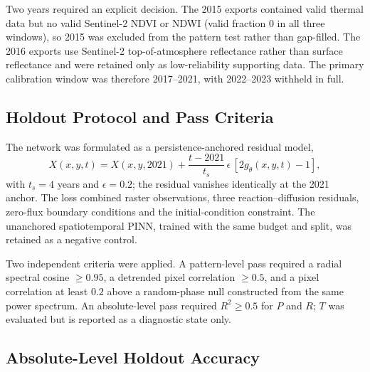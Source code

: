 \documentclass[12pt,a4paper]{article}
\begin{document}
Two years required an explicit decision. The 2015 exports contained valid thermal data but no valid Sentinel-2 NDVI or NDWI (valid fraction 0 in all three windows), so 2015 was excluded from the pattern test rather than gap-filled. The 2016 exports use Sentinel-2 top-of-atmosphere reflectance rather than surface reflectance and were retained only as low-reliability supporting data. The primary calibration window was therefore 2017--2021, with 2022--2023 withheld in full.

\subsection{Holdout Protocol and Pass Criteria}

The network was formulated as a persistence-anchored residual model,
\begin{equation}
	X(x,y,t)=X(x,y,2021)+\frac{t-2021}{t_s}\,\epsilon\,[2g_{\theta}(x,y,t)-1],
	\label{eq:s9_residual}
\end{equation}
with $t_s=4$ years and $\epsilon=0.2$; the residual vanishes identically at the 2021 anchor. The loss combined raster observations, three reaction--diffusion residuals, zero-flux boundary conditions and the initial-condition constraint. The unanchored spatiotemporal PINN, trained with the same budget and split, was retained as a negative control.

Two independent criteria were applied. A pattern-level pass required a radial spectral cosine $\ge0.95$, a detrended pixel correlation $\ge0.5$, and a pixel correlation at least $0.2$ above a random-phase null constructed from the same power spectrum. An absolute-level pass required $R^2\ge0.5$ for $P$ and $R$; $T$ was evaluated but is reported as a diagnostic state only.

\subsection{Absolute-Level Holdout Accuracy}
\end{document}
